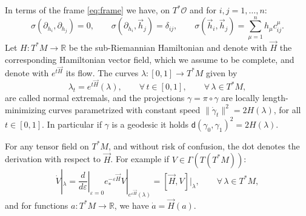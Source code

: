 \documentclass[11pt,a4paper]{article}
\theoremstyle{plain}
\theoremstyle{definition}
\theoremstyle{remark}
\numberwithin{equation}{section}
\newcommand{\R}{\mathbb{R}} %
\newcommand{\sfd}{\mathsf d}
\begin{document}
In terms of the frame \eqref{eq:frame} we have, on $T^*\mathcal{O}$ and for $i,j=1,\dots,n$:
\begin{equation}\label{eq:sigmaframe}
\sigma(\partial_{h_i},\partial_{h_j})=0, \qquad \sigma(\partial_{h_i},\vec{h}_j)=\delta_{ij},\qquad \sigma(\vec{h}_i,\vec{h}_j) =  \sum_{\mu=1}^n h_\mu c_{ij}^\mu.
\end{equation}
Let $H : T^*M \to \R$ be the sub-Riemannian Hamiltonian and denote with $\vec{H}$ the corresponding Hamiltonian vector field, which we assume to be complete, and denote with $e^{t\vec{H}}$ its flow. The curves $\lambda :[0,1]\to T^*M$ given by
\begin{equation}
\lambda_t = e^{t\vec{H}}(\lambda), \qquad \forall\, t\in [0,1],\qquad \forall\, \lambda \in T^*M,
\end{equation}
are called normal extremals, and the projections $\gamma = \pi\circ\gamma$ are locally length-minimizing curves parametrized with constant speed $\|\dot\gamma_t\|^2 = 2H(\lambda)$, for all $t\in [0,1]$. In particular if $\gamma$ is a geodesic it holds $\sfd(\gamma_0,\gamma_1)^2 = 2H(\lambda)$.

For any tensor field on $T^*M$, and without risk of confusion, the dot denotes the derivation with respect to $\vec{H}$. For example if $V\in \Gamma(T(T^*M))$:
\begin{equation}
\dot{V}|_{\lambda}= \left.\frac{d}{d\varepsilon}\right|_{\varepsilon=0} e^{-\varepsilon \vec{H}}_*V|_{e^{\varepsilon\vec{H}}(\lambda)}=[\vec{H},V]|_{\lambda}, \qquad \forall\, \lambda \in T^*M,
\end{equation}
and for functions $a :T^*M \to \R$, we have $\dot{a} = \vec{H}(a)$.
\end{document}
